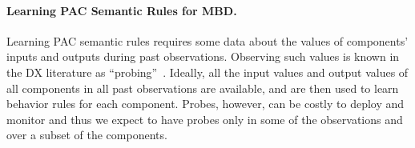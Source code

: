 \documentclass[12pt]{article}
\begin{document}



\paragraph{Learning PAC Semantic Rules for MBD.}
Learning PAC semantic rules requires some data about the values of components' inputs and outputs 
during past observations. Observing such values is known in the DX literature as ``probing''~\cite{deKleer1987diagnosing,rish2004real,feldman2010model}. 
Ideally, all the input values and output values of all components in all past observations are available, 
and are then used to learn behavior rules for each component. 
Probes, however, can be costly to deploy and monitor and thus we expect to have probes only in some of the observations and over a subset of the components. 
\end{document}
